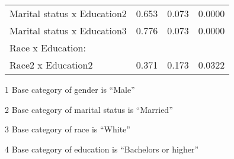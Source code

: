 \begin{table}[H]
\begin{threeparttable}
\begin{tabular}{lrcr}
  \hspace{5pt}   Marital status x Education2 		& 0.653		& 0.073 & 0.0000 \\ 
  \hspace{5pt}   Marital status x Education3 		& 0.776		& 0.073 & 0.0000 \\ 
Race x Education: & & & \\
  \hspace{5pt}   Race2 x Education2 			& 0.371		& 0.173 & 0.0322 \\ 
  \hline
\end{tabular}
\begin{tablenotes}\footnotesize
\item[1] Base category of gender is ``Male''
\item[2] Base category of marital status is ``Married''
\item[3] Base category of race is ``White''
\item[4] Base category of education is ``Bachelors or higher''
\end{tablenotes}
\end{threeparttable}
\label{tab:Table3Reg}
\end{table}


